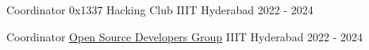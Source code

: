 
\begin{cventries}
  \cventry
    {Coordinator} %
    {0x1337 Hacking Club} %
    {IIIT Hyderabad} %
    {2022 - 2024} %
    {}

  \cventry
    {Coordinator} %
    {\href{https://osdg.iiit.ac.in/}{Open Source Developers Group}} %
    {IIIT Hyderabad} %
    {2022 - 2024} %
    {}
\end{cventries}
